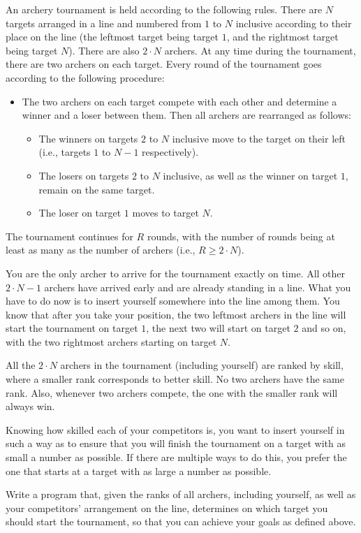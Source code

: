 An archery tournament is held according to the following rules. There are $N$ targets arranged in a line and numbered from $1$ to $N$ inclusive according to their place on the line (the leftmost target being target $1$, and the rightmost target being target $N$). There are also $2 \cdot N$ archers. At any time during the tournament, there are two archers on each target. Every round of the tournament goes according to the following procedure:
\begin{itemize}
\item The two archers on each target compete with each other and determine a winner and a loser between them. Then all archers are rearranged as follows:
\begin{itemize}
\item The winners on targets $2$ to $N$ inclusive move to the target on their left (i.e., targets $1$ to $N - 1$ respectively).
\item The losers on targets $2$ to $N$ inclusive, as well as the winner on target $1$, remain on the same target.
\item The loser on target $1$ moves to target $N$.
\end{itemize}
\end{itemize}

The tournament continues for $R$ rounds, with the number of rounds being at least as many as the number of archers (i.e., $R \ge 2 \cdot N$).

You are the only archer to arrive for the tournament exactly on time. All other $2 \cdot N - 1$ archers have arrived early and are already standing in a line. What you have to do now is to insert yourself somewhere into the line among them. You know that after you take your position, the two leftmost archers in the line will start the tournament on target $1$, the next two will start on target $2$ and so on, with the two rightmost archers starting on target $N$.

All the $2 \cdot N$ archers in the tournament (including yourself) are ranked by skill, where a smaller rank corresponds to better skill. No two archers have the same rank. Also, whenever two archers compete, the one with the smaller rank will always win.

Knowing how skilled each of your competitors is, you want to insert yourself in such a way as to ensure that you will finish the tournament on a target with as small a number as possible. If there are multiple ways to do this, you prefer the one that starts at a target with as large a number as possible.

Write a program that, given the ranks of all archers, including yourself, as well as your competitors' arrangement on the line, determines on which target you should start the tournament, so that you can achieve your goals as defined above. 